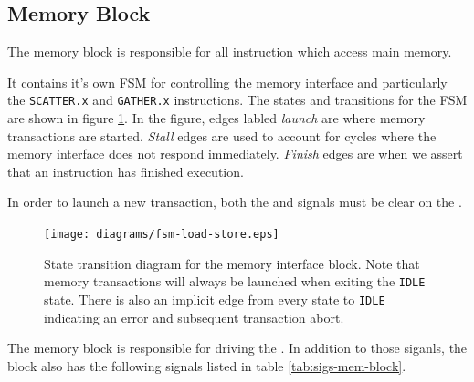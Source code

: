 \documentclass{article}
\begin{document}
\subsection{Memory Block}

The memory block is responsible for all instruction which access main
memory.

It contains it's own FSM for controlling the memory interface
and particularly the {\tt SCATTER.x} and {\tt GATHER.x} instructions.
The states and transitions for the FSM are shown in figure 
\ref{fig:mem-block-fsm}. 
In the figure, edges labled {\em launch} are
where memory transactions are started.
{\em Stall} edges are used to
account for cycles where the memory interface does not respond immediately.
{\em Finish} edges are when we assert that an instruction has finished
execution.

In order to launch a new transaction, both the 
and  signals must be clear on the
.

\begin{figure}
\centering
\texttt{[image: diagrams/fsm-load-store.eps]}
\caption{State transition diagram for the memory interface block.
Note that memory transactions will always be launched when exiting the
{\tt IDLE} state. There is also an implicit edge from every state to
{\tt IDLE} indicating an error and subsequent transaction abort.}
\label{fig:mem-block-fsm}
\end{figure}

The memory block is responsible for driving the .
In addition to those siganls, the block also has the following signals
listed in table \ref{tab:sigs-mem-block}.
\end{document}
